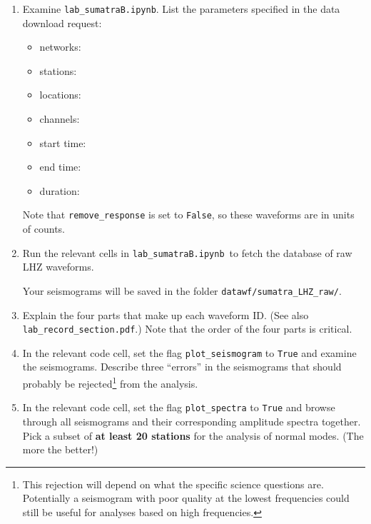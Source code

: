 \documentclass[11pt,titlepage,fleqn]{article}
\newcommand{\tfile}{{\tt lab\_sumatraB.ipynb}}
\begin{document}
\begin{enumerate}
\item Examine \tfile. List the parameters specified in the data download request:

\begin{itemize}
\item networks: 
\item stations: 
\item locations: 
\item channels: 
\item start time: 
\item end time: 
\item duration: 
\end{itemize}

Note that \verb+remove_response+ is set to \verb+False+, so these waveforms are in units of counts.



\item Run the relevant cells in \tfile\ to fetch the database of raw LHZ waveforms.

Your seismograms will be saved in the folder \verb+datawf/sumatra_LHZ_raw/+.

\item Explain the four parts that make up each waveform ID. (See also \verb+lab_record_section.pdf+.) Note that the order of the four parts is critical.

\item In the relevant code cell, set the flag \verb+plot_seismogram+ to \verb+True+ and examine the seismograms. Describe three ``errors'' in the seismograms that should probably be rejected\footnote{This rejection will depend on what the specific science questions are. Potentially a seismogram with poor quality at the lowest frequencies could still be useful for analyses based on high frequencies.} from the analysis.


\item In the relevant code cell, set the flag \verb+plot_spectra+ to \verb+True+ and browse through all seismograms and their corresponding amplitude spectra together. Pick a subset of {\bf at least 20 stations} for the analysis of normal modes. (The more the better!)


\end{enumerate}
\end{document}
